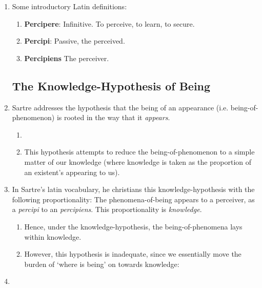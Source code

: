 \begin{enumerate}
  \item Some introductory Latin definitions:
  \begin{enumerate}
    \item \textbf{Percipere}: Infinitive. To perceive, to learn, to secure.
    \item \textbf{Percipi}: Passive, the perceived.
    \item \textbf{Percipiens} The perceiver.
  \end{enumerate}

  \subsection{The Knowledge-Hypothesis of Being}
  \item Sartre addresses the hypothesis that the being of an appearance (i.e. being-of-phenomenon) is rooted in the way that it \emph{appears}.
  \begin{enumerate}
    \item {}
    \item This hypothesis attempts to reduce the being-of-phenomenon to a simple matter of our knowledge (where knowledge is taken as the proportion of an existent's appearing to us).
  \end{enumerate}
  \item In Sartre's latin vocabulary, he christians this knowledge-hypothesis with the following proportionality: The phenomena-of-being appears to a perceiver, as a \emph{percipi} to an \emph{percipiens}. This proportionality is \emph{knowledge}.
  \begin{enumerate}
    \item Hence, under the knowledge-hypothesis, the being-of-phenomena lays within knowledge.
    \item However, this hypothesis is inadequate, since we essentially move the burden of \enquote*{where is being} on towards knowledge:
  \end{enumerate}
  \item {}

\end{enumerate}
